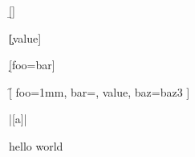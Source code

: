 


\a

\b[]

\c[value]

\d[foo=bar]

\e[bar=baz, foo = bar]

\f[
  foo=1mm,
  bar=\roman,
  value,
  baz=baz3
]

\foo[a, b, c]{\foo}{\bar}{\baz}

\bar[a]{\bar}{}{\baz}


hello \foo{} world

